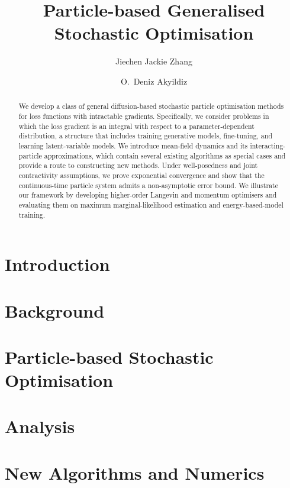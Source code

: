 \documentclass{article}
\title{Particle-based Generalised Stochastic Optimisation}
\author{Jiechen Jackie Zhang}
\author{O.~Deniz Akyildiz}
\affil{Department of Mathematics, Imperial College London}
\affil[]{{\textcolor{blue}{\footnotesize \texttt{\{jackie.zhang21,  deniz.akyildiz\}@imperial.ac.uk}}}}
\begin{document}
\maketitle

\begin{abstract}
We develop a class of general diffusion-based stochastic particle optimisation methods for loss functions with intractable gradients.  Specifically, we consider problems in which the loss gradient is an integral with respect to a parameter-dependent distribution, a structure that includes training generative models, fine-tuning, and learning latent-variable models.  We introduce mean-field dynamics and its interacting-particle approximations, which contain several existing algorithms as special cases and provide a route to constructing new methods. Under well-posedness and joint contractivity assumptions, we prove exponential convergence and show that the continuous-time particle system admits a non-asymptotic error bound. We illustrate our framework by developing higher-order Langevin and momentum optimisers and evaluating them on maximum marginal-likelihood estimation and energy-based-model training.
\end{abstract}


\section{Introduction}


\section{Background}\label{sec:background}


\section{Particle-based Stochastic Optimisation}\label{sec:main_system}


\section{Analysis}\label{sec:analysis}


\section{New Algorithms and Numerics}\label{sec:algorithm}

\end{document}
